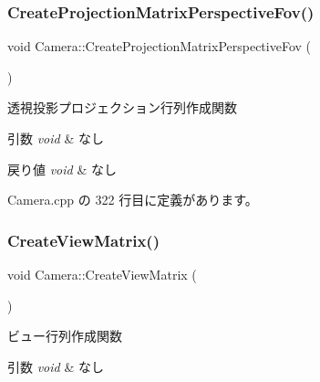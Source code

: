 \mbox{\label{class_camera_af9f52f44747bba0be03aa8dda5cf5914}} 
\subsubsection{\texorpdfstring{Create\+Projection\+Matrix\+Perspective\+Fov()}{CreateProjectionMatrixPerspectiveFov()}}
{\footnotesize\ttfamily void Camera\+::\+Create\+Projection\+Matrix\+Perspective\+Fov (\begin{DoxyParamCaption}{ }\end{DoxyParamCaption})}



透視投影プロジェクション行列作成関数 


\begin{DoxyParams}{引数}
{\em void} & なし \\
\hline
\end{DoxyParams}

\begin{DoxyRetVals}{戻り値}
{\em void} & なし \\
\hline
\end{DoxyRetVals}


 Camera.\+cpp の 322 行目に定義があります。

\mbox{\label{class_camera_a5b4993ffb218536cb31d6d5224453b1a}} 
\subsubsection{\texorpdfstring{Create\+View\+Matrix()}{CreateViewMatrix()}}
{\footnotesize\ttfamily void Camera\+::\+Create\+View\+Matrix (\begin{DoxyParamCaption}{ }\end{DoxyParamCaption})}



ビュー行列作成関数 


\begin{DoxyParams}{引数}
{\em void} & なし \\
\hline
\end{DoxyParams}

